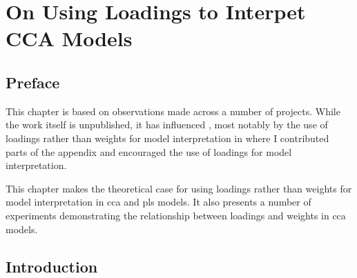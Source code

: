 \graphicspath{{chapters/loadings/}}
\chapter{On Using Loadings to Interpet CCA Models}\label{chap:loadings}
\minitoc
\section{Preface}

This chapter is based on observations made across a number of projects.
While the work itself is unpublished, it has influenced , most notably by the use of loadings rather than weights for model interpretation in \citet{} where I contributed parts of the appendix and encouraged the use of loadings for model interpretation.

This chapter makes the theoretical case for using loadings rather than weights for model interpretation in \acrshort{cca} and \acrshort{pls} models.
It also presents a number of experiments demonstrating the relationship between loadings and weights in \acrshort{cca} models.

\section{Introduction}

